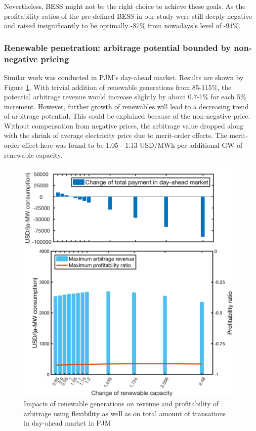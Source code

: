 Nevertheless, BESS might not be the right choice to achieve these goals. As the profitability ratios of the pre-defined BESS in our study were still deeply negative and raised insignificantly to be optimally -87\% from nowadays's level of -94\%.

\subsubsection{Renewable penetration: arbitrage potential bounded by non-negative pricing}

Similar work was conducted in PJM's day-ahead market. Results are shown by Figure \ref{fig:renew_pjm}. With trivial addition of renewable generations from 85-115\%, the potential arbitrage revenue would increase slightly by about 0.7-1\% for each 5\% increment. However, further growth of renewables will lead to a decreasing trend of arbitrage potential. This could be explained because of the non-negative price. Without compensation from negative prices, the arbitrage value dropped along with the shrink of average electricity price due to merit-order effects. The merit-order effect here was found to be 1.05 - 1.13 USD/MWh per additional GW of renewable capacity.

\begin{figure}[h!]
	\centering
	\includegraphics[width=0.95\linewidth]{Figures/RenewablePenetration_PJM}
	\caption{Impacts of renewable generations on revenue and profitability of arbitrage using flexibility as well as on total amount of transations in day-ahead market in PJM}
	\label{fig:renew_pjm}
\end{figure}

